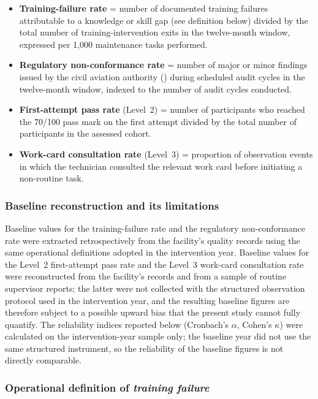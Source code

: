\begin{itemize}[leftmargin=*]
  \item \textbf{Training-failure rate} = number of documented training
        failures attributable to a knowledge or skill gap (see definition
        below) divided by the total number of training-intervention exits
        in the twelve-month window, expressed per 1{,}000 maintenance tasks
        performed.
  \item \textbf{Regulatory non-conformance rate} = number of major or minor
        findings issued by the civil aviation authority (\CAA{}) during
        scheduled audit cycles in the twelve-month window, indexed to the
        number of audit cycles conducted.
  \item \textbf{First-attempt pass rate} (Level~2) = number of participants
        who reached the 70/100 pass mark on the first attempt divided by
        the total number of participants in the assessed cohort.
  \item \textbf{Work-card consultation rate} (Level~3) = proportion of
        observation events in which the technician consulted the relevant
        work card before initiating a non-routine task.
\end{itemize}

\subsubsection*{Baseline reconstruction and its limitations}
\label{subsubsec:baseline}

Baseline values for the training-failure rate and the regulatory
non-conformance rate were extracted retrospectively from the facility's
quality records using the same operational definitions adopted in the
intervention year. Baseline values for the Level~2 first-attempt pass rate
and the Level~3 work-card consultation rate were reconstructed from the
facility's \LMS{} records and from a sample of routine supervisor reports;
the latter were not collected with the structured observation protocol
used in the intervention year, and the resulting baseline figures are
therefore subject to a possible upward bias that the present study cannot
fully quantify. The reliability indices reported below (Cronbach's
$\alpha$, Cohen's $\kappa$) were calculated on the intervention-year
sample only; the baseline year did not use the same structured
instrument, so the reliability of the baseline figures is not directly
comparable.

\subsubsection*{Operational definition of \textit{training failure}}
\label{subsubsec:training-failure}

